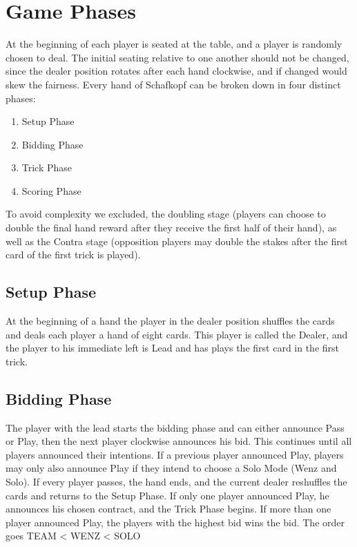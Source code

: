 \section{Game Phases}
At the beginning of each player is seated at the table, and a player is randomly chosen to deal.
The initial seating relative to one another should not be changed, since the dealer position rotates after each hand
clockwise, and if changed would skew the fairness.
\newline
Every hand of Schafkopf can be broken down in four distinct phases:
\begin{enumerate}
    \item Setup Phase
    \item Bidding Phase
    \item Trick Phase
    \item Scoring Phase
\end{enumerate}
To avoid complexity we excluded, the doubling stage (players can choose to double the final hand reward after they
receive the first half of their hand), as well as the Contra stage (opposition players may double the stakes after the
first card of the first trick is played).

\subsection{Setup Phase}
At the beginning of a hand the player in the dealer position shuffles the cards and deals each player a hand of eight
cards.
This player is called the Dealer, and the player to his immediate left is Lead and has plays the first card in the
first trick.

\subsection{Bidding Phase}
The player with the lead starts the bidding phase and can either announce Pass or Play, then the next player
clockwise announces his bid.
This continues until all players announced their intentions.
If a previous player announced Play, players may only also announce Play if they intend to choose a Solo Mode (Wenz
and Solo).
If every player passes, the hand ends, and the current dealer reshuffles the cards and returns to the Setup Phase.
If only one player announced Play, he announces his chosen contract, and the Trick Phase begins.
If more than one player announced Play, the players with the highest bid wins the bid.
The order goes TEAM < WENZ < SOLO

